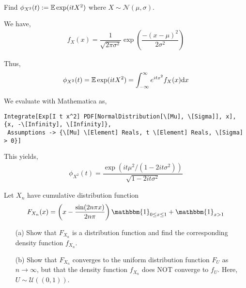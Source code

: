 \documentclass[10pt]{article}
\begin{document}
\begin{problem}[Exercise 3.5]
    Find \( \phi_{X^2}(t):=\mathbb{E} \exp(itX^2) \) where \( X\sim \mathcal{N}(\mu,\sigma) \).
\end{problem}

\begin{solution}[Solution]
We have,
\begin{align*}
    f_X(x) = \dfrac{1}{\sqrt{2\pi\sigma^2}}\exp\left(\dfrac{-(x-\mu)^2}{2\sigma^2}\right) 
\end{align*}

Thus,
\begin{align*}
    \phi_{X^2}(t) = \mathbb{E} \exp(itX^2) = \int_{-\infty}^{\infty} e^{itx^2}f_X(x)\mathrm{d} x 
\end{align*}

We evaluate with Mathematica as,
\begin{lstlisting}
Integrate[Exp[I t x^2] PDF[NormalDistribution[\[Mu], \[Sigma]], x], {x, -\[Infinity], \[Infinity]}, 
 Assumptions -> {\[Mu] \[Element] Reals, t \[Element] Reals, \[Sigma] > 0}]
\end{lstlisting}

This yields,
\begin{align*}
    \phi_{X^2}(t) = \dfrac{\exp(it\mu^2/(1-2it\sigma^2))}{\sqrt{1-2it\sigma^2}}
\end{align*}
\end{solution}

\begin{problem}[Exercise 3.6]
    Let \( X_n \) have cumulative distribution function
    \begin{align*}
        F_{X_n}(x)=\left(x-\dfrac{\sin(2n\pi x)}{2n\pi}\right)\mathbbm{1}_{0\leq x\leq 1}+\mathbbm{1}_{x>1}
    \end{align*}
    \begin{enumerate}
        \item[(a)] Show that \( F_{X_n} \) is a distribution function and find the corresponding density function \( f_{X_n} \).
        \item[(b)] Show that \( F_{X_n} \) converges to the uniform distribution function \( F_U \) as \( n \to\infty \), but that the density function \( f_{X_n} \) does NOT converge to \( f_U \). Here, \( U\sim \mathcal{U}((0,1)) \).
    \end{enumerate}
\end{problem}
\end{document}
